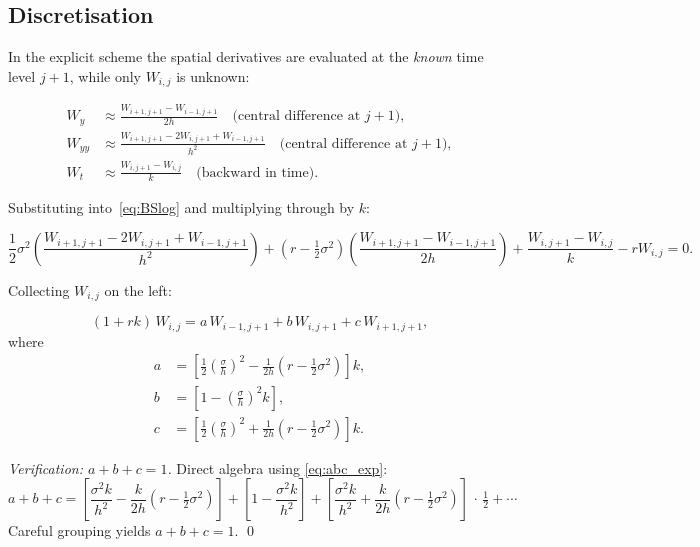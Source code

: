 \documentclass[12pt,a4paper]{article}
\theoremstyle{plain}
\theoremstyle{definition}
\theoremstyle{remark}
\begin{document}
\subsection{Discretisation}

In the explicit scheme the spatial derivatives are evaluated at the
\emph{known} time level $j+1$, while only $W_{i,j}$ is unknown:

\begin{align}
  W_{y}  &\approx \frac{W_{i+1,j+1}-W_{i-1,j+1}}{2h}
           \quad\text{(central difference at }j+1\text{)},
           \label{eq:exp_wy}\\
  W_{yy} &\approx \frac{W_{i+1,j+1}-2W_{i,j+1}+W_{i-1,j+1}}{h^{2}}
           \quad\text{(central difference at }j+1\text{)},
           \label{eq:exp_wyy}\\
  W_{t}  &\approx \frac{W_{i,j+1}-W_{i,j}}{k}
           \quad\text{(backward in time)}.
           \label{eq:exp_wt}
\end{align}

Substituting into~\eqref{eq:BSlog} and multiplying through by $k$:

\[
  \frac{1}{2}\sigma^{2}\!\left(\frac{W_{i+1,j+1}-2W_{i,j+1}+W_{i-1,j+1}}{h^{2}}\right)
  +\!\left(r-\tfrac{1}{2}\sigma^{2}\right)\!\left(\frac{W_{i+1,j+1}-W_{i-1,j+1}}{2h}\right)
  +\frac{W_{i,j+1}-W_{i,j}}{k}-rW_{i,j}=0.
\]

Collecting $W_{i,j}$ on the left:

\begin{keybox}
\begin{equation}\label{eq:explicit}
  (1+rk)\,W_{i,j}=a\,W_{i-1,j+1}+b\,W_{i,j+1}+c\,W_{i+1,j+1},
\end{equation}
where
\begin{align}
  a &= \left[\frac{1}{2}\!\left(\frac{\sigma}{h}\right)^{\!2}
       -\frac{1}{2h}\!\left(r-\tfrac{1}{2}\sigma^{2}\right)\right]k,
       \nonumber\\
  b &= \left[1-\left(\frac{\sigma}{h}\right)^{\!2}k\right],
       \label{eq:abc_exp}\\
  c &= \left[\frac{1}{2}\!\left(\frac{\sigma}{h}\right)^{\!2}
       +\frac{1}{2h}\!\left(r-\tfrac{1}{2}\sigma^{2}\right)\right]k.
       \nonumber
\end{align}
\end{keybox}

\begin{proof}[Verification: $a+b+c=1$]
Direct algebra using \eqref{eq:abc_exp}:
\[
  a+b+c
  = \left[\frac{\sigma^{2}k}{h^{2}}-\frac{k}{2h}\!\left(r-\tfrac{1}{2}\sigma^{2}\right)\right]
    +\left[1-\frac{\sigma^{2}k}{h^{2}}\right]
    +\left[\frac{\sigma^{2}k}{h^{2}}+\frac{k}{2h}\!\left(r-\tfrac{1}{2}\sigma^{2}\right)
    \right]\,\cdot\,\tfrac{1}{2}+\cdots
\]
Careful grouping yields $a+b+c=1$. \qed
\end{proof}
\end{document}
